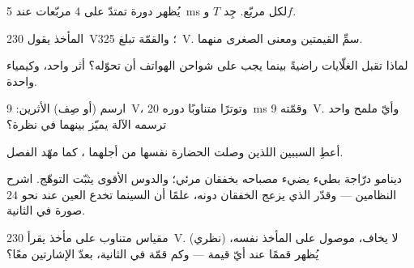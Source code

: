 \begin{exercise}[$\star$]\label{exo:g9:alternating-current:4}
يُظهر  دورة تمتدّ على $4$ مربّعات عند \qty{5}{ms}
لكل مربّع. جِد $T$ و$f$.
\end{exercise}

\begin{exercise}[$\star$]\label{exo:g9:alternating-current:5}
المأخذ يقول \qty{230}{V}؛ والقمّة تبلغ \qty{325}{V}. سمِّ
القيمتين ومعنى الصغرى منهما.
\end{exercise}

\begin{exercise}[$\star$]\label{exo:g9:alternating-current:6}
لماذا تقبل الغلّايات  راضيةً بينما يجب على
شواحن الهواتف أن تحوّله؟ أثر واحد، وكيمياء واحدة.
\end{exercise}

\begin{exercise}[$\star$]\label{exo:g9:alternating-current:7}
ارسم (أو صِف) الأثرين:  \qty{9}{V}، وتوترًا متناوبًا
دوره \qty{20}{ms} وقمّته \qty{9}{V}. وأيّ ملمح واحد ترسمه
الآلة يميّز بينهما في نظرة؟
\end{exercise}

\begin{exercise}[$\star$]\label{exo:g9:alternating-current:8}
أعطِ السببين اللذين وصلت الحضارة نفسها من أجلهما ، كما مهّد الفصل.
\end{exercise}

\begin{exercise}[$\star\star$]\label{exo:g9:alternating-current:9}
دينامو درّاجة بطيء يضيء مصباحه بخفقان مرئي؛ والدوس الأقوى
يثبّت التوهّج. اشرح النظامين  --- وقدّر  الذي
يزعج الخفقان دونه، علمًا أن السينما تخدع العين عند نحو $24$
صورة في الثانية.
\end{exercise}

\begin{exercise}[$\star\star$]\label{exo:g9:alternating-current:10}
مقياس  متناوب على مأخذ يقرأ \qty{230}{V}. 
(نظري) لا يخاف، موصول على المأخذ نفسه، يُظهر قممًا عند أيّ
قيمة --- وكم قمّة في الثانية، بعدّ الإشارتين معًا؟
\end{exercise}

